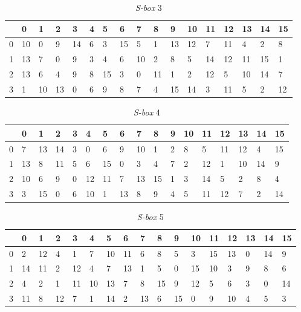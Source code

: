 \begin{enumerate}
\begin{table}
	\begin{center}
		\begin{tabular}{|l|l|l|l|l|l|l|l|l|l|l|l|l|l|l|l|l|}
				\hline
				& 0 & 1	& 2 & 3 & 4 & 5 & 6 & 7 & 8 & 9 & 10 & 11 & 12 & 13 & 14 & 15	\\ \hline
			0 & 10 & 0 & 9 & 14 & 6 & 3 & 15 & 5 & 1 & 13 & 12 & 7 & 11 & 4 & 2 & 8	\\ \hline
			1 & 13 & 7 & 0 & 9 & 3 & 4 & 6 & 10 & 2 & 8 & 5 & 14 & 12 & 11 & 15 & 1	\\ \hline
			2 & 13 & 6 & 4 & 9 & 8 & 15 & 3 & 0 & 11 & 1 & 2 & 12 & 5 & 10 & 14 & 7	\\ \hline
			3 & 1 & 10 & 13 & 0 & 6 & 9 & 8 & 7 & 4 & 15 & 14 & 3 & 11 & 5 & 2 & 12	\\ \hline
		\end{tabular}
	\end{center}
	\label{table:s_box3}
	\caption{\textit{S-box} 3}
\end{table}

\begin{table}
	\begin{center}
		\begin{tabular}{|l|l|l|l|l|l|l|l|l|l|l|l|l|l|l|l|l|}
				\hline
				& 0 & 1	& 2 & 3 & 4 & 5 & 6 & 7 & 8 & 9 & 10 & 11 & 12 & 13 & 14 & 15	\\ \hline
			0 & 7	&	13	&	14	&	3	&	0	&	6	&	9	&	10	&	1	&	2	&	8	&	5	&	11	&	12	&	4	&	15	\\ \hline
			1 & 13	&	8	&	11	&	5	&	6	&	15	&	0	&	3	&	4	&	7	&	2	&	12	&	1	&	10	&	14	&	9	\\ \hline
			2 & 10	&	6	&	9	&	0	&	12	&	11	&	7	&	13	&	15	&	1	&	3	&	14	&	5	&	2	&	8	&	4	\\ \hline
			3 & 3	&	15	&	0	&	6	&	10	&	1	&	13	&	8	&	9	&	4	&	5	&	11	&	12	&	7	&	2	&	14	\\ \hline
		\end{tabular}
	\end{center}
	\label{table:s_box4}
	\caption{\textit{S-box} 4}
\end{table}

\begin{table}
	\begin{center}
		\begin{tabular}{|l|l|l|l|l|l|l|l|l|l|l|l|l|l|l|l|l|}
				\hline
				& 0 & 1	& 2 & 3 & 4 & 5 & 6 & 7 & 8 & 9 & 10 & 11 & 12 & 13 & 14 & 15	\\ \hline
			0	&	2	&	12	&	4	&	1	&	7	&	10	&	11	&	6	&	8	&	5	&	3	&	15	&	13	&	0	&	14	&	9	\\ \hline
			1	&	14	&	11	&	2	&	12	&	4	&	7	&	13	&	1	&	5	&	0	&	15	&	10	&	3	&	9	&	8	&	6	\\ \hline
			2	&	4	&	2	&	1	&	11	&	10	&	13	&	7	&	8	&	15	&	9	&	12	&	5	&	6	&	3	&	0	&	14	\\ \hline
			3	&	11	&	8	&	12	&	7	&	1	&	14	&	2	&	13	&	6	&	15	&	0	&	9	&	10	&	4	&	5	&	3	\\ \hline
		\end{tabular}
	\end{center}
	\label{table:s_box5}
	\caption{\textit{S-box} 5}
\end{table}


\end{enumerate}
